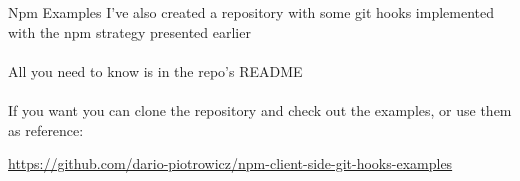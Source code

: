\documentclass[11pt]{beamer}
\begin{document}
\begin{frame}{Npm Examples}
  I've also created a repository with some git hooks implemented with the npm strategy presented earlier\\~\\
  All you need to know is in the repo's README\\~\\
  If you want you can clone the repository and check out the examples, or use them as reference:
  \begin{center}
   \href{https://github.com/dario-piotrowicz/npm-client-side-git-hooks-examples}{
      {\color{purple} {\small https://github.com/dario-piotrowicz/npm-client-side-git-hooks-examples} }
   }
  \end{center}
\end{frame}
\end{document}
